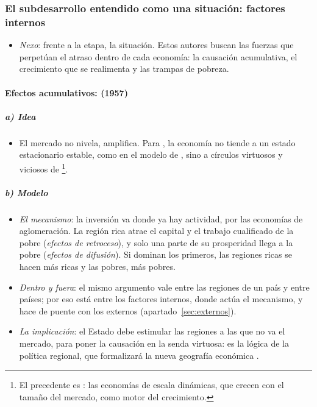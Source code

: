 \documentclass[11pt]{article}
\begin{document}
\subsubsection{El subdesarrollo entendido como una situación: factores internos}\label{sec:internos}

\begin{itemize}
\item \emph{Nexo}: frente a la etapa, la situación. Estos autores buscan las fuerzas que perpetúan el atraso dentro de cada economía: la causación acumulativa, el crecimiento que se realimenta y las trampas de pobreza.
\end{itemize}

\paragraph{Efectos acumulativos:  (1957)}

\subparagraph{a) Idea}

\begin{itemize}
\item El mercado no nivela, amplifica. Para , la economía no tiende a un estado estacionario estable, como en el modelo de , sino a círculos virtuosos y viciosos de \nocite{Myrdal1957}\footnote{El precedente es \textcite{Young1928Increasing}: las economías de escala dinámicas, que crecen con el tamaño del mercado, como motor del crecimiento.}.
\end{itemize}

\subparagraph{b) Modelo}

\begin{itemize}
\item \emph{El mecanismo}: la inversión va donde ya hay actividad, por las economías de aglomeración. La región rica atrae el capital y el trabajo cualificado de la pobre (\emph{efectos de retroceso}), y solo una parte de su prosperidad llega a la pobre (\emph{efectos de difusión}). Si dominan los primeros, las regiones ricas se hacen más ricas y las pobres, más pobres.
\item \emph{Dentro y fuera}: el mismo argumento vale entre las regiones de un país y entre países; por eso  está entre los factores internos, donde actúa el mecanismo, y hace de puente con los externos (apartado~\ref{sec:externos}).
\item \emph{La implicación}: el Estado debe estimular las regiones a las que no va el mercado, para poner la causación en la senda virtuosa: es la lógica de la política regional, que formalizará la nueva geografía económica .
\end{itemize}
\end{document}
